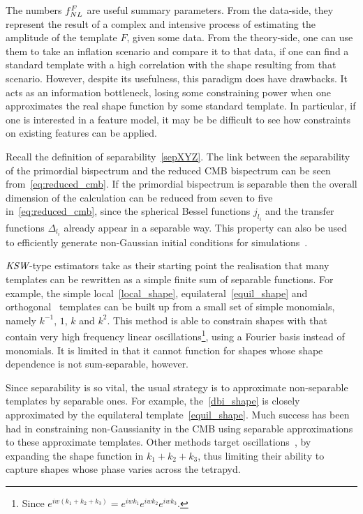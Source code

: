 The numbers $f_{NL}^F$ are useful summary parameters.
From the data-side, they represent the result of
a complex and intensive process
of estimating the amplitude of the template $F$,
given some data. From the theory-side, one
can use them to take an inflation scenario and compare it
to that data, if one can find a standard template
with a high correlation with the shape resulting
from that scenario.
However, despite its usefulness, this paradigm does
have drawbacks. It acts as an information bottleneck,
losing some constraining power when one approximates
the real shape function by some standard template.
In particular, if one is interested in a feature model,
it may be be difficult to see how constraints on existing
features can be applied.


Recall the definition of separability~\eqref{sepXYZ}.
The link between the separability of the primordial bispectrum
and the reduced CMB bispectrum can be seen from~\eqref{eq:reduced_cmb}.
If the primordial bispectrum is separable then the overall dimension
of the calculation can be reduced from seven to five in~\eqref{eq:reduced_cmb},
since the spherical Bessel functions $j_{l_i}$ and the
transfer functions $\Delta_{l_i}$ already appear in a separable way.
This property can also be used to
efficiently generate non-Gaussian initial conditions
for simulations~\cite{Scoccimarro_2012}.


    ${\textit{\text{KSW}}}$-type estimators take as their starting point the realisation that many
    templates can be rewritten as a simple finite sum of separable functions.
    For example, the simple local~\eqref{local_shape}, equilateral~\eqref{equil_shape}
    and orthogonal~\cite{Planck_NG_2013}
    templates can be built up from a small set of
    simple monomials, namely $k^{-1}$, $1$, $k$ and $k^{2}$.
    This method is able to constrain shapes with that contain very high frequency linear oscillations\footnote{
    Since $e^{iw(k_1+k_2+k_3)}=e^{iwk_1}e^{iwk_2}e^{iwk_3}$.},
    using a Fourier basis instead of monomials.
    It is limited in that it cannot function for shapes whose shape dependence is not
    sum-separable, however.


Since separability is so vital, the usual strategy is to approximate non-separable templates
by separable ones.
For example, the~\eqref{dbi_shape} is closely approximated by the equilateral
template~\eqref{equil_shape}.
Much success has been had in constraining non-Gaussianity
in the CMB using separable approximations to these approximate templates.
Other methods target oscillations~\cite{reso_estimator, excited_estimator},
by expanding the shape function
in $k_1+k_2+k_3$, thus limiting their ability to capture shapes whose
phase varies across the tetrapyd.



